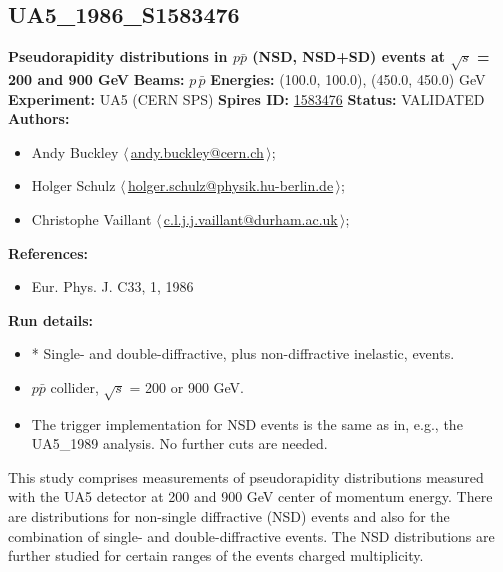 \subsection[UA5\_1986\_S1583476]{UA5\_1986\_S1583476\,\cite{Alner:1986xu}}
\textbf{Pseudorapidity distributions in $p\bar{p}$ (NSD, NSD+SD) events at \ensuremath{\sqrt{s}} = 200 and 900 GeV}\newline
\textbf{Beams:} $p$\,$\bar{p}$ \newline
\textbf{Energies:} (100.0, 100.0), (450.0, 450.0) GeV \newline
\textbf{Experiment:} UA5 (CERN SPS) \newline
\textbf{Spires ID:} \href{http://www.slac.stanford.edu/spires/find/hep/www?rawcmd=key+1583476}{1583476}\newline
\textbf{Status:} VALIDATED\newline
\textbf{Authors:}
\begin{itemize}
  \item Andy Buckley $\langle\,$\href{mailto:andy.buckley@cern.ch}{andy.buckley@cern.ch}$\,\rangle$;
  \item Holger Schulz $\langle\,$\href{mailto:holger.schulz@physik.hu-berlin.de}{holger.schulz@physik.hu-berlin.de}$\,\rangle$;
  \item Christophe Vaillant $\langle\,$\href{mailto:c.l.j.j.vaillant@durham.ac.uk}{c.l.j.j.vaillant@durham.ac.uk}$\,\rangle$;
\end{itemize}
\textbf{References:}
\begin{itemize}
  \item Eur. Phys. J. C33, 1, 1986
\end{itemize}
\textbf{Run details:}
\begin{itemize}

  \item * Single- and double-diffractive, plus non-diffractive inelastic, events.
  \item $p\bar{p}$ collider, \ensuremath{\sqrt{s}} = 200 or 900 GeV.
  \item The trigger implementation for NSD events is the same as in, e.g., the UA5_1989 analysis. No further cuts are needed.\end{itemize}

\noindent This study comprises measurements of pseudorapidity distributions measured with the UA5 detector at 200 and 900 GeV center of momentum energy. There are distributions for non-single diffractive (NSD) events and also for the combination of single- and double-diffractive events. The NSD distributions are further studied for certain ranges of the events charged multiplicity.

